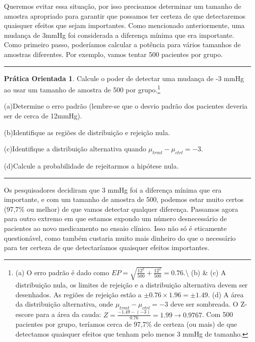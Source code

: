 \documentclass[
]{book}
\theoremstyle{definition}
\theoremstyle{definition}
\theoremstyle{definition}
\newtheorem{exercise}{Prática Orientada}[chapter]
\theoremstyle{definition}
\theoremstyle{remark}
\begin{document}
Queremos evitar essa situação, por isso precisamos determinar um tamanho de amostra apropriado para garantir que possamos ter certeza de que detectaremos quaisquer efeitos que sejam importantes. Como mencionado anteriormente, uma mudança de 3mmHg foi considerada a diferença mínima que era importante. Como primeiro passo, poderíamos calcular a potência para vários tamanhos de amostras diferentes. Por exemplo, vamos tentar 500 pacientes por grupo.

\begin{center}\rule{0.5\linewidth}{0.5pt}\end{center}

\begin{exercise}
\protect\hypertarget{exr:unnamed-chunk-215}{}{\label{exr:unnamed-chunk-215} }Calcule o poder de detectar uma mudança de -3 mmHg ao usar um tamanho de amostra de 500 por grupo.\footnote{(a) O erro padrão é dado como \(EP = \sqrt{\frac{12^2}{500} + \frac{12^2}{500}} = 0.76\).\textbackslash{}
  (b) \& (c) A distribuição nula, os limites de rejeição e a distribuição alternativa devem ser desenhados. As regiões de rejeição estão a \(\pm 0.76 \times 1.96 = \pm 1.49\). (d) A área da distribuição alternativa, onde \(\mu_{trmt} - \mu_{ctrl} = -3\) deve ser sombreada. O Z-escore para a área da cauda: \(Z = \frac{-1.49 - (-3)}{0.76} = 1.99 \to 0.9767\). Com 500 pacientes por grupo, teríamos cerca de 97,7\% de certeza (ou mais) de que detectamos quaisquer efeitos que tenham pelo menos 3 mmHg de tamanho.}

(a)Determine o erro padrão (lembre-se que o desvio padrão dos pacientes deveria ser de cerca de 12mmHg).

(b)Identifique as regiões de distribuição e rejeição nula.

(c)Identifique a distribuição alternativa quando \(\mu_{trmt} - \mu_{ctrl} = -3\).

(d)Calcule a probabilidade de rejeitarmos a hipótese nula.
\end{exercise}

\begin{center}\rule{0.5\linewidth}{0.5pt}\end{center}

Os pesquisadores decidiram que 3 mmHg foi a diferença mínima que era importante, e com um tamanho de amostra de 500, podemos estar muito certos (97,7\% ou melhor) de que vamos detectar qualquer diferença. Passamos agora para outro extremo em que estamos expondo um número desnecessário de pacientes ao novo medicamento no ensaio clínico. Isso não só é eticamente questionável, como também custaria muito mais dinheiro do que o necessário para ter certeza de que detectaríamos quaisquer efeitos importantes.
\end{document}

